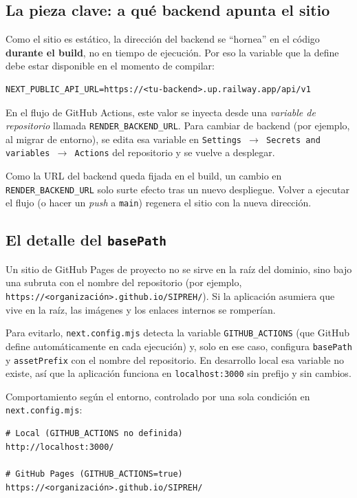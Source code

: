 \subsection*{La pieza clave: a qué backend apunta el sitio}

Como el sitio es estático, la dirección del backend se ``hornea'' en el código \textbf{durante el build}, no en tiempo de ejecución. Por eso la variable que la define debe estar disponible en el momento de compilar:

\begin{verbatim}
NEXT_PUBLIC_API_URL=https://<tu-backend>.up.railway.app/api/v1
\end{verbatim}

En el flujo de GitHub Actions, este valor se inyecta desde una \textit{variable de repositorio} llamada \texttt{RENDER\_BACKEND\_URL}. Para cambiar de backend (por ejemplo, al migrar de entorno), se edita esa variable en \texttt{Settings $\to$ Secrets and variables $\to$ Actions} del repositorio y se vuelve a desplegar.

\begin{remark}
Como la URL del backend queda fijada en el build, un cambio en \texttt{RENDER\_BACKEND\_URL} solo surte efecto tras un nuevo despliegue. Volver a ejecutar el flujo (o hacer un \textit{push} a \texttt{main}) regenera el sitio con la nueva dirección.
\end{remark}

\subsection*{El detalle del \texttt{basePath}}

Un sitio de GitHub Pages de proyecto no se sirve en la raíz del dominio, sino bajo una subruta con el nombre del repositorio (por ejemplo, \texttt{https://<organización>.github.io/SIPREH/}). Si la aplicación asumiera que vive en la raíz, las imágenes y los enlaces internos se romperían.

Para evitarlo, \texttt{next.config.mjs} detecta la variable \texttt{GITHUB\_ACTIONS} (que GitHub define automáticamente en cada ejecución) y, solo en ese caso, configura \texttt{basePath} y \texttt{assetPrefix} con el nombre del repositorio. En desarrollo local esa variable no existe, así que la aplicación funciona en \texttt{localhost:3000} sin prefijo y sin cambios.

\begin{example}
Comportamiento según el entorno, controlado por una sola condición en \texttt{next.config.mjs}:
\begin{verbatim}
# Local (GITHUB_ACTIONS no definida)
http://localhost:3000/

# GitHub Pages (GITHUB_ACTIONS=true)
https://<organización>.github.io/SIPREH/
\end{verbatim}
\end{example}


